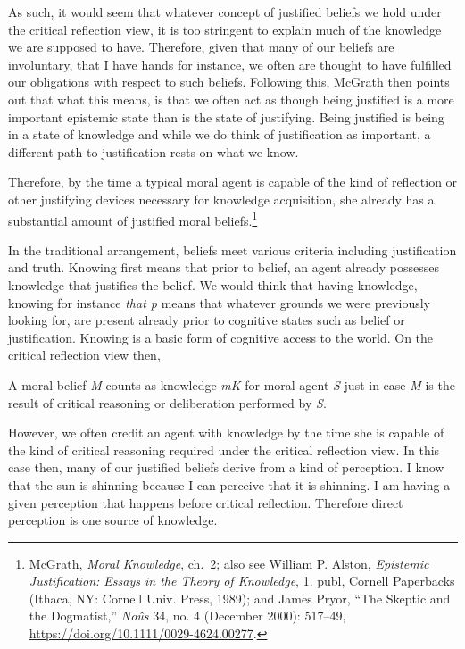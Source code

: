 \documentclass[phdthesis,12pt,final,a4paper]{wuthesis}
\theoremstyle{definition}
\theoremstyle{definition}
\theoremstyle{definition}
\theoremstyle{definition}
\theoremstyle{remark}
\begin{document}
As such, it would seem that whatever concept of justified beliefs we hold under the critical reflection view, it is too stringent to explain much of the knowledge we are supposed to have. Therefore, given that many of our beliefs are involuntary, that I have hands for instance, we often are thought to have fulfilled our obligations with respect to such beliefs. Following this, McGrath then points out that what this means, is that we often act as though being justified is a more important epistemic state than is the state of justifying. Being justified is being in a state of knowledge and while we do think of justification as important, a different path to justification rests on what we know.

Therefore, by the time a typical moral agent is capable of the kind of reflection or other justifying devices necessary for knowledge acquisition, she already has a substantial amount of justified moral beliefs.\footnote{McGrath, \emph{Moral {Knowledge}}, ch.~2; also see William P. Alston, \emph{Epistemic Justification: Essays in the Theory of Knowledge}, 1. publ, Cornell Paperbacks (Ithaca, NY: Cornell Univ. Press, 1989); and James Pryor, {``The {Skeptic} and the {Dogmatist},''} \emph{Noûs} 34, no. 4 (December 2000): 517--49, \url{https://doi.org/10.1111/0029-4624.00277}.}

In the traditional arrangement, beliefs meet various criteria including justification and truth. Knowing first means that prior to belief, an agent already possesses knowledge that justifies the belief. We would think that having knowledge, knowing for instance \emph{that p} means that whatever grounds we were previously looking for, are present already prior to cognitive states such as belief or justification. Knowing is a basic form of cognitive access to the world. On the critical reflection view then,

A moral belief \emph{M} counts as knowledge \emph{mK} for moral agent \emph{S} just in case \emph{M} is the result of critical reasoning or deliberation performed by \emph{S}.

However, we often credit an agent with knowledge by the time she is capable of the kind of critical reasoning required under the critical reflection view. In this case then, many of our justified beliefs derive from a kind of perception. I know that the sun is shinning because I can perceive that it is shinning. I am having a given perception that happens before critical reflection. Therefore direct perception is one source of knowledge.
\end{document}
